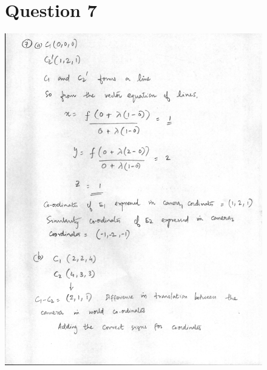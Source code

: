 \documentclass{article}
\begin{document}
\begin{figure}
\section*{Question 7}  
\includegraphics[width=15cm]{4.jpg}
\end{figure}
\end{document}
